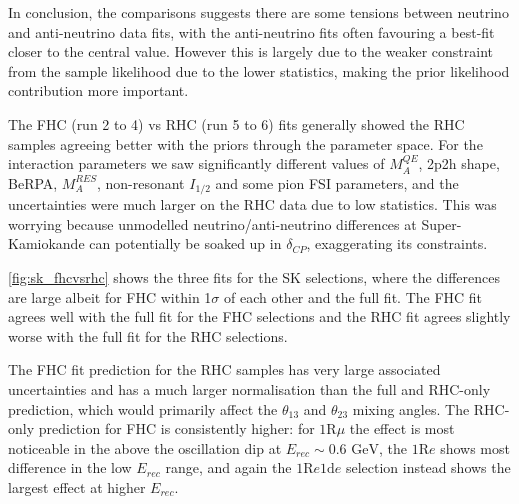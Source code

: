 In conclusion, the comparisons suggests there are some tensions between neutrino and anti-neutrino data fits, with the anti-neutrino fits often favouring a best-fit closer to the central value. However this is largely due to the weaker constraint from the sample likelihood due to the lower statistics, making the prior likelihood contribution more important.


The FHC (run 2 to 4) vs RHC (run 5 to 6) fits generally showed the RHC samples agreeing better with the priors through the parameter space. For the interaction parameters we saw significantly different values of $M_A^{QE}$, 2p2h shape, BeRPA, $M_A^{RES}$, non-resonant $I_{1/2}$ and some pion FSI parameters, and the uncertainties were much larger on the RHC data due to low statistics. This was worrying because unmodelled neutrino/anti-neutrino differences at Super-Kamiokande can potentially be soaked up in $\delta_{CP}$, exaggerating its constraints.

\autoref{fig:sk_fhcvsrhc} shows the three fits for the SK selections, where the differences are large albeit for FHC within 1$\sigma$ of each other and the full fit. The FHC fit agrees well with the full fit for the FHC selections and the RHC fit agrees slightly worse with the full fit for the RHC selections.

The FHC fit prediction for the RHC samples has very large associated uncertainties and has a much larger normalisation than the full and RHC-only prediction, which would primarily affect the $\theta_{13}$ and $\theta_{23}$ mixing angles. The RHC-only prediction for FHC is consistently higher: for $1\text{R}\mu$ the effect is most noticeable in the above the oscillation dip at $E_{rec}\sim0.6\text{ GeV}$, the $1\text{R}e$ shows most difference in the low $E_{rec}$ range, and again the $1\text{R}e1\text{d}e$ selection instead shows the largest effect at higher $E_{rec}$.

